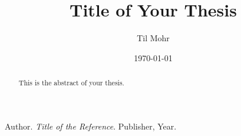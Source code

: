 \documentclass[
	12pt, %
	a4paper, %
	oneside, %
]{report}
\title{Title of Your Thesis}
\author{Til Mohr}
\date{\today}
\begin{document}
\maketitle



\begin{abstract}
This is the abstract of your thesis.
\end{abstract}

\tableofcontents




\begin{thebibliography}{9}
 Author. \textit{Title of the Reference}. Publisher, Year.
\end{thebibliography}
\end{document}
